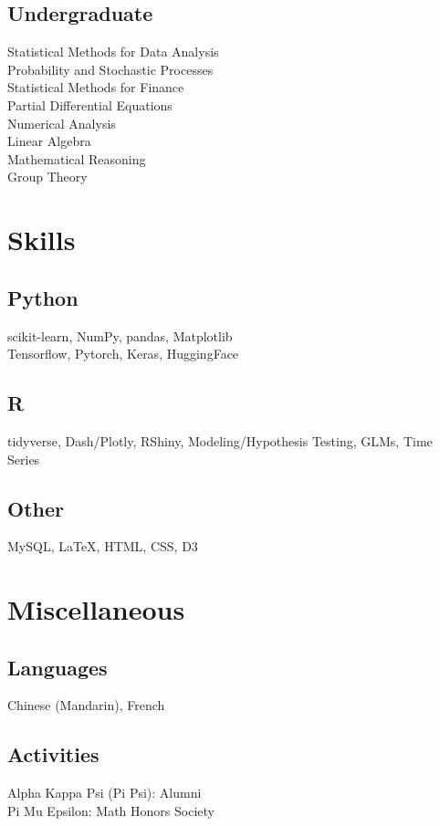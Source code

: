 \documentclass[]{deedy-resume-openfont}
\begin{document}
\begin{minipage}[t]{0.33\textwidth}
\subsection{Undergraduate} 
Statistical Methods for Data Analysis \\
Probability and Stochastic Processes \\
Statistical Methods for Finance \\
Partial Differential Equations \\
Numerical Analysis \\
Linear Algebra \\
Mathematical Reasoning \\
Group Theory \\
\sectionsep





\section{Skills}
\subsection{Python}
scikit-learn, NumPy, pandas, Matplotlib \\
Tensorflow, Pytorch, Keras, HuggingFace \\
\subsection{R}
tidyverse, Dash/Plotly, RShiny, Modeling/Hypothesis Testing,
GLMs, Time Series
\subsection{Other}
MySQL, \LaTeX, HTML, CSS, D3
\sectionsep

\section{Miscellaneous}
\subsection{Languages}
Chinese (Mandarin), French
\subsection{Activities}
Alpha Kappa Psi (Pi Psi): Alumni \\
Pi Mu Epsilon: Math Honors Society
\sectionsep

%
%

\end{minipage} 
\end{document}

